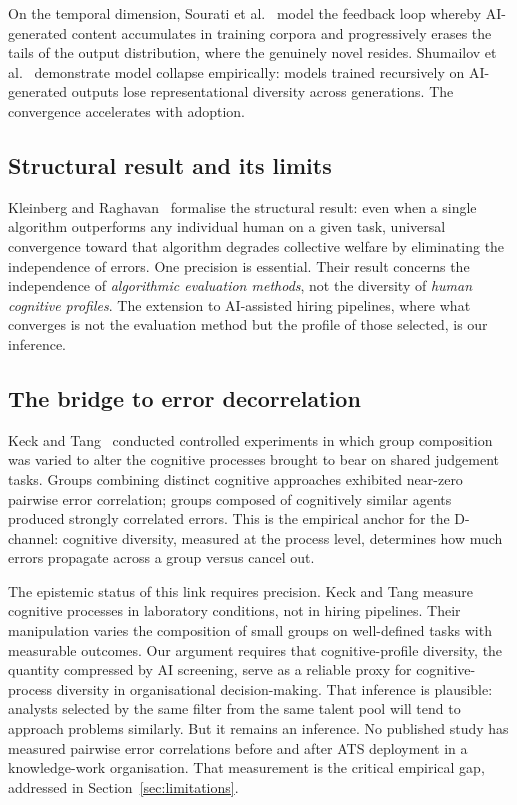 \documentclass[11pt,a4paper]{article}
\begin{document}
On the temporal dimension, Sourati et
al.~\cite{sourati_tics_2026} model the feedback loop whereby AI-generated
content accumulates in training corpora and progressively erases the tails of
the output distribution, where the genuinely novel resides. Shumailov et
al.~\cite{shumailov_nature_2024} demonstrate model collapse empirically:
models trained recursively on AI-generated outputs lose representational
diversity across generations. The convergence accelerates with adoption.

\subsection{Structural result and its limits}

Kleinberg and Raghavan~\cite{kleinberg_pnas_2021} formalise the structural
result: even when a single algorithm outperforms any individual human on a
given task, universal convergence toward that algorithm degrades collective
welfare by eliminating the independence of errors. One precision is
essential. Their result concerns the independence of \textit{algorithmic
evaluation methods}, not the diversity of \textit{human cognitive profiles}.
The extension to AI-assisted hiring pipelines, where what converges is not
the evaluation method but the profile of those selected, is our inference.

\subsection{The bridge to error decorrelation}

Keck and Tang~\cite{keck_psychsci_2020} conducted controlled experiments in
which group composition was varied to alter the cognitive processes brought to
bear on shared judgement tasks. Groups combining distinct cognitive
approaches exhibited near-zero pairwise error correlation; groups composed of
cognitively similar agents produced strongly correlated errors. This is the
empirical anchor for the D-channel: cognitive diversity, measured at the
process level, determines how much errors propagate across a group versus
cancel out.

The epistemic status of this link requires precision. Keck and Tang measure
cognitive processes in laboratory conditions, not in hiring pipelines. Their
manipulation varies the composition of small groups on well-defined tasks
with measurable outcomes. Our argument requires that cognitive-profile diversity, the quantity
compressed by AI screening, serve as a reliable proxy for cognitive-process
diversity in organisational decision-making. That inference is plausible: analysts
selected by the same filter from the same talent pool will tend to approach
problems similarly. But it remains an inference. No published study has
measured pairwise error correlations before and after ATS deployment in a
knowledge-work organisation. That measurement is the critical empirical gap,
addressed in Section~\ref{sec:limitations}.
\end{document}
